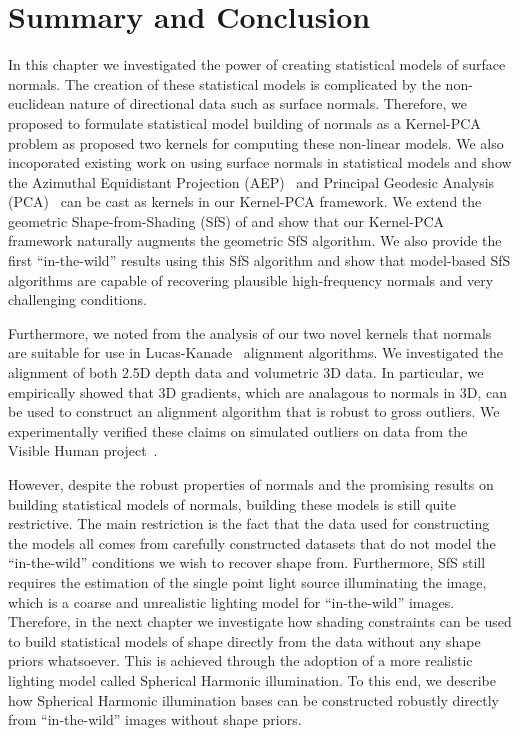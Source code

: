 \section{Summary and Conclusion}\label{sec:singl_img_summary}
In this chapter we investigated the power of creating statistical models
of surface normals. The creation of these statistical models is complicated
by the non-euclidean nature of directional data such as surface normals.
Therefore, we proposed to formulate statistical model building of normals
as a Kernel-PCA problem as proposed two kernels for computing these non-linear
models. We also incoporated existing work on using surface normals in 
statistical models and show the 
Azimuthal Equidistant Projection (AEP)~\cite{smith2006recovering} and
Principal Geodesic Analysis (PCA)~\cite{smith2008facial} can be cast as 
kernels in our Kernel-PCA framework. We extend the geometric 
Shape-from-Shading (SfS) of \citet{smith2006recovering} and show that our 
Kernel-PCA framework naturally augments the geometric SfS algorithm. We also
provide the first ``in-the-wild'' results using this SfS algorithm and show
that model-based SfS algorithms are capable of recovering plausible high-frequency
normals and very challenging conditions.

Furthermore, we noted from the analysis of our two novel kernels that normals
are suitable for use in Lucas-Kanade~\cite{lucas1981iterative} alignment
algorithms. We investigated the alignment of both 2.5D depth data and volumetric
3D data. In particular, we empirically showed that 3D gradients, which are
analagous to normals in 3D, can be used to construct an alignment algorithm
that is robust to gross outliers. We experimentally verified these claims
on simulated outliers on data from the Visible Human project~\cite{RefWorks:81}.

However, despite the robust properties of normals and the promising results
on building statistical models of normals, building these models is still
quite restrictive. The main restriction is the fact that the data used
for constructing the models all comes from carefully constructed datasets
that do not model the ``in-the-wild'' conditions we wish to recover shape
from. Furthermore, SfS still requires the estimation of the single point light 
source illuminating the image, which is a coarse and unrealistic lighting
model for ``in-the-wild'' images. Therefore, in the next chapter we investigate
how shading constraints can be used to build statistical models of shape
directly from the data without any shape priors whatsoever. This is achieved
through the adoption of a more realistic lighting model called Spherical
Harmonic illumination. To this end, we describe how Spherical Harmonic illumination
bases can be constructed robustly directly from ``in-the-wild'' images
without shape priors.